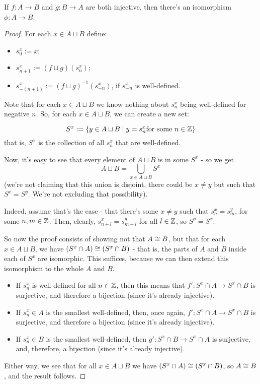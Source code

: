 \begin{theorem}
	If $f:A\to B$ and $g:B\to A$ are both injective, then there's an isomorphism $\phi:A\to B$.
\end{theorem}
\begin{proof}
	For each $x\in A\sqcup B$ define:
	\begin{itemize}
		\item $s_0^x:=x$;
		\item $s_{n+1}^x:=(f\sqcup g)(s_n^x)$;
		\item $s_{-(n+1)}^x:=(f\sqcup g)^{-1}(s_{-n}^x)$, if $s_{-n}^x$ is well-defined.
	\end{itemize}

Note that for each $x\in A\sqcup B$ we know nothing about $s_n^x$ being well-defined for negative $n$. So, for each $x\in A\sqcup B$, we can create a new set:

\[S^x:=\{y\in A\sqcup B\mid y=s_n^x\mbox{for some }n\in\mathbb{Z}\}\]that is, $S^x$ is the collection of all $s^x_n$ that are well-defined.

Now, it's easy to see that every element of $A\sqcup B$ is in some $S^x$ - so we get
\[A\sqcup B=\bigcup_{x\in A\sqcup B}S^x\](we're not claiming that this union is disjoint, there could be $x\neq y$ but such that $S^x=S^y$. We're not excluding that possibility).

Indeed, assume that's the case - that there's some $x\neq y$ such that $s^x_n=s^y_m$, for some $n,m\in\mathbb{Z}$. Then, clearly, $s^x_{n+l}=s^y_{m+l}$ for all $l\in\mathbb{Z}$, so $S^y=S^x$.

So now the proof consists of showing not that $A\cong B$, but that for each $x\in A\sqcup B$, we have $(S^x\cap A)\cong(S^x\cap B)$ - that is, the parts of $A$ and $B$ inside each of $S^x$ are isomorphic. This suffices, because we can then extend this isomorphism to the whole $A$ and $B$.

\begin{itemize}
	\item If $s^x_n$ is well-defined for all $n\in\mathbb{Z}$, then this means that $f':S^x\cap A\to S^x\cap B$ is surjective, and therefore a bijection (since it's already injective).
	
	\item If $s^x_n\in A$ is the smallest well-defined, then, once again, $f':S^x\cap A\to S^x\cap B$ is surjective, and therefore a bijection (since it's already injective).
	
	\item If $s^x_n\in B$ is the smallest well-defined, then $g':S^x\cap B\to S^x\cap A$ is surjective, and, therefore, a bijection (since it's already injective).
\end{itemize}

Either way, we see that for all $x\in A\sqcup B$ we have $(S^x\cap A)\cong(S^x\cap B)$, so $A\cong B$, and the result follows.
\end{proof}

